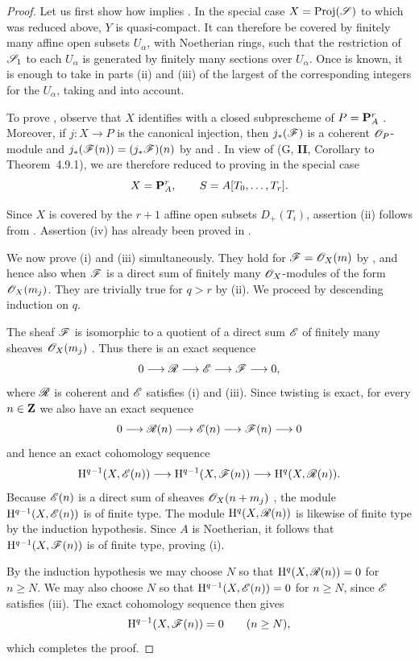 \begin{proof}
Let us first show how  implies .
In the special case $X=\operatorname{Proj}(\mathscr{S})$ to which  was reduced above, $Y$ is quasi-compact.
It can therefore be covered by finitely many affine open subsets $U_\alpha$, with Noetherian rings, such that the restriction of $\mathscr{S}_1$ to each $U_\alpha$ is generated by finitely many sections over $U_\alpha$.
Once  is known, it is enough to take in parts (ii) and (iii) of  the largest of the corresponding integers for the $U_\alpha$, taking  and  into account.

To prove , observe that $X$ identifies with a closed subprescheme of $P=\mathbf{P}_A^r$ .
Moreover, if $j:X\to P$ is the canonical injection, then $j_*(\mathscr{F})$ is a coherent $\mathscr{O}_P$-module and $j_*(\mathscr{F}(n))=(j_*\mathscr{F})(n)$
by  and .
In view of (G, \textbf{II}, Corollary to Theorem~4.9.1), we are therefore reduced to proving  in the special case
\[
  X=\mathbf{P}_A^r,
  \qquad S=A[T_0,\ldots,T_r].
\]


Since $X$ is covered by the $r+1$ affine open subsets $D_+(T_i)$, assertion (ii) follows from .
Assertion (iv) has already been proved in .

We now prove (i) and (iii) simultaneously.
They hold for $\mathscr{F}=\mathscr{O}_X(m)$ by , and hence also when $\mathscr{F}$ is a direct sum of finitely many $\mathscr{O}_X$-modules of the form $\mathscr{O}_X(m_j)$.
They are trivially true for $q>r$ by (ii).
We proceed by descending induction on $q$.

The sheaf $\mathscr{F}$ is isomorphic to a quotient of a direct sum $\mathscr{E}$ of finitely many sheaves $\mathscr{O}_X(m_j)$ .
Thus there is an exact sequence
\[
  0\longrightarrow\mathscr{R}\longrightarrow\mathscr{E}
   \longrightarrow\mathscr{F}\longrightarrow0,
\]
where $\mathscr{R}$ is coherent  and $\mathscr{E}$ satisfies (i) and (iii).
Since twisting is exact, for every $n\in\mathbf{Z}$ we also have an exact sequence
\[
  0\longrightarrow\mathscr{R}(n)\longrightarrow\mathscr{E}(n)
   \longrightarrow\mathscr{F}(n)\longrightarrow0
\]
and hence an exact cohomology sequence
\[
  \mathrm{H}^{q-1}(X,\mathscr{E}(n))
  \longrightarrow\mathrm{H}^{q-1}(X,\mathscr{F}(n))
  \longrightarrow\mathrm{H}^q(X,\mathscr{R}(n)).
\]
Because $\mathscr{E}(n)$ is a direct sum of sheaves $\mathscr{O}_X(n+m_j)$ , the module $\mathrm{H}^{q-1}(X,\mathscr{E}(n))$ is of finite type.
The module $\mathrm{H}^q(X,\mathscr{R}(n))$ is likewise of finite type by the induction hypothesis.
Since $A$ is Noetherian, it follows that $\mathrm{H}^{q-1}(X,\mathscr{F}(n))$ is of finite type, proving (i).

By the induction hypothesis we may choose $N$ so that $\mathrm{H}^q(X,\mathscr{R}(n))=0$ for $n\geq N$.
We may also choose $N$ so that $\mathrm{H}^{q-1}(X,\mathscr{E}(n))=0$ for $n\geq N$, since $\mathscr{E}$ satisfies (iii).
The exact cohomology sequence then gives
\[
  \mathrm{H}^{q-1}(X,\mathscr{F}(n))=0
  \qquad(n\geq N),
\]
which completes the proof.
\end{proof}

